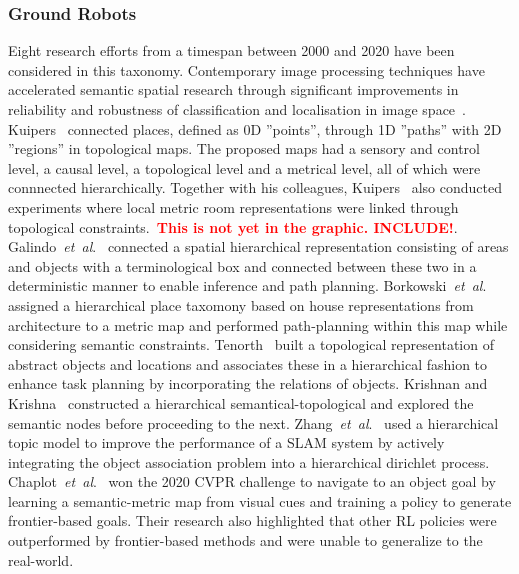 \documentclass[twocolumn,letterpaper]{IEEEAerospaceCLS}  %
\newcommand{\abbreviation}[1]{\emph{#1}.}
\newcommand{\etal}{\abbreviation{et~al}}
\newcommand\todo[1]{\textbf{\textcolor{red}{#1}}}
\begin{document}
\subsubsection{Ground Robots} \label{sssec:ResLitCont}
Eight research efforts from a timespan between 2000 and 2020 have been considered in this taxonomy. Contemporary image processing techniques have accelerated semantic spatial research through significant improvements in reliability and robustness of classification and localisation in image space~\cite{alom_history_2018}.\\
Kuipers~\cite{kuipers_spatial_2000} connected places, defined as 0D ''points'', through 1D ''paths'' with 2D ''regions'' in topological maps. The proposed maps had a sensory and control level, a causal level, a topological level and a metrical level, all of which were connnected hierarchically. Together with his colleagues, Kuipers~\cite{kuipers_local_2004} also conducted experiments where local metric room representations were linked through topological constraints.~\todo{This is not yet in the graphic. INCLUDE!}. Galindo~\etal~\cite{galindo_robot_2008} connected a spatial hierarchical representation consisting of areas and objects with a terminological box and connected between these two in a deterministic manner to enable inference and path planning. Borkowski~\etal~\cite{borkowski_towards_2010} assigned a hierarchical place taxomony based on house representations from architecture to a metric map and performed path-planning within this map while considering semantic constraints. Tenorth~\cite{tenorth_knowrob-map_2010} built a topological representation of abstract objects and locations and associates these in a hierarchical fashion to enhance task planning by incorporating the relations of objects. Krishnan and Krishna~\cite{krishnan_visual_2010} constructed a hierarchical semantical-topological and explored the semantic nodes before proceeding to the next. Zhang~\etal~\cite{zhang_hierarchical_2019} used a hierarchical topic model to improve the performance of a SLAM system by actively integrating the object association problem into a hierarchical dirichlet process.\\
Chaplot~\etal~\cite{chaplot_object_2020} won the 2020 CVPR challenge to navigate to an object goal by learning a semantic-metric map from visual cues and training a policy to generate frontier-based goals. Their research also highlighted that other RL policies were outperformed by frontier-based methods and were unable to generalize to the real-world.
\end{document}
